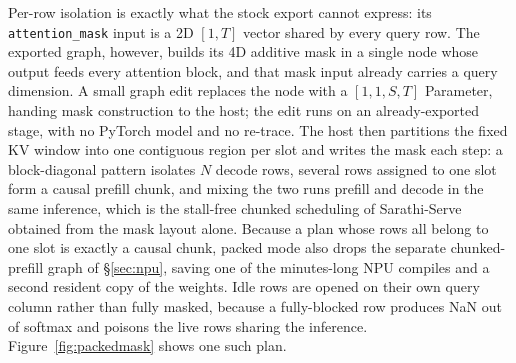 \documentclass[11pt]{article}
\newcommand{\brk}{\discretionary{}{}{}}
\begin{document}
Per-row isolation is exactly what the stock export cannot express: its \texttt{attention\_\brk mask} input is a 2D $[1,T]$ vector shared by every query row. The exported graph, however, builds its 4D additive mask in a single node whose output feeds every attention block, and that mask input already carries a query dimension. A small graph edit replaces the node with a $[1,1,S,T]$ Parameter, handing mask construction to the host; the edit runs on an already-exported stage, with no PyTorch model and no re-trace. The host then partitions the fixed KV window into one contiguous region per slot and writes the mask each step: a block-diagonal pattern isolates $N$ decode rows, several rows assigned to one slot form a causal prefill chunk, and mixing the two runs prefill and decode in the same inference, which is the stall-free chunked scheduling of Sarathi-Serve~\cite{agrawal2024sarathi} obtained from the mask layout alone. Because a plan whose rows all belong to one slot is exactly a causal chunk, packed mode also drops the separate chunked-prefill graph of \S\ref{sec:npu}, saving one of the minutes-long NPU compiles and a second resident copy of the weights. Idle rows are opened on their own query column rather than fully masked, because a fully-blocked row produces NaN out of softmax and poisons the live rows sharing the inference. Figure~\ref{fig:packedmask} shows one such plan.
\end{document}
